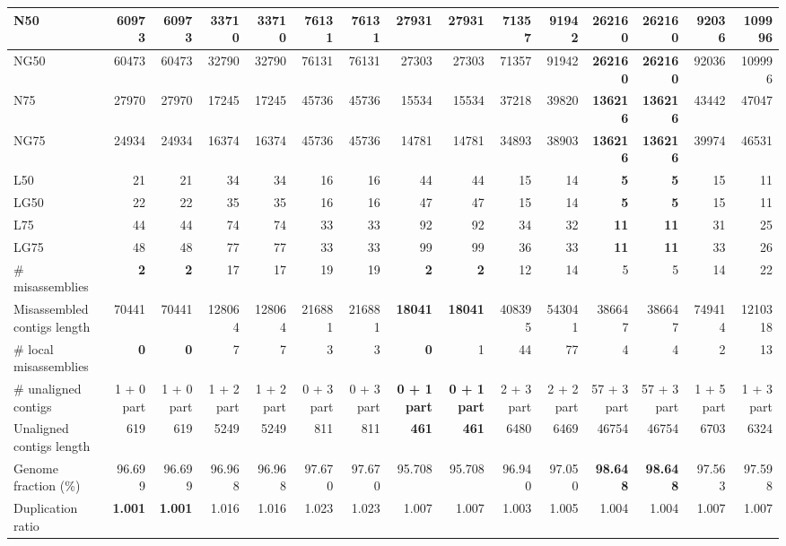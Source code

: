 \documentclass[12pt,a4paper]{article}
\begin{document}
\begin{table}[ht]
\begin{center}
\begin{tabular}{|l*{14}{|r}|}
N50 & 60973 & 60973 & 33710 & 33710 & 76131 & 76131 & 27931 & 27931 & 71357 & 91942 & {\bf 262160} & {\bf 262160} & 92036 & 109996 \\ \hline
NG50 & 60473 & 60473 & 32790 & 32790 & 76131 & 76131 & 27303 & 27303 & 71357 & 91942 & {\bf 262160} & {\bf 262160} & 92036 & 109996 \\ \hline
N75 & 27970 & 27970 & 17245 & 17245 & 45736 & 45736 & 15534 & 15534 & 37218 & 39820 & {\bf 136216} & {\bf 136216} & 43442 & 47047 \\ \hline
NG75 & 24934 & 24934 & 16374 & 16374 & 45736 & 45736 & 14781 & 14781 & 34893 & 38903 & {\bf 136216} & {\bf 136216} & 39974 & 46531 \\ \hline
L50 & 21 & 21 & 34 & 34 & 16 & 16 & 44 & 44 & 15 & 14 & {\bf 5} & {\bf 5} & 15 & 11 \\ \hline
LG50 & 22 & 22 & 35 & 35 & 16 & 16 & 47 & 47 & 15 & 14 & {\bf 5} & {\bf 5} & 15 & 11 \\ \hline
L75 & 44 & 44 & 74 & 74 & 33 & 33 & 92 & 92 & 34 & 32 & {\bf 11} & {\bf 11} & 31 & 25 \\ \hline
LG75 & 48 & 48 & 77 & 77 & 33 & 33 & 99 & 99 & 36 & 33 & {\bf 11} & {\bf 11} & 33 & 26 \\ \hline
\# misassemblies & {\bf 2} & {\bf 2} & 17 & 17 & 19 & 19 & {\bf 2} & {\bf 2} & 12 & 14 & 5 & 5 & 14 & 22 \\ \hline
Misassembled contigs length & 70441 & 70441 & 128064 & 128064 & 216881 & 216881 & {\bf 18041} & {\bf 18041} & 408395 & 543041 & 386647 & 386647 & 749414 & 1210318 \\ \hline
\# local misassemblies & {\bf 0} & {\bf 0} & 7 & 7 & 3 & 3 & {\bf 0} & 1 & 44 & 77 & 4 & 4 & 2 & 13 \\ \hline
\# unaligned contigs & 1 + 0 part & 1 + 0 part & 1 + 2 part & 1 + 2 part & 0 + 3 part & 0 + 3 part & {\bf 0 + 1 part} & {\bf 0 + 1 part} & 2 + 3 part & 2 + 2 part & 57 + 3 part & 57 + 3 part & 1 + 5 part & 1 + 3 part \\ \hline
Unaligned contigs length & 619 & 619 & 5249 & 5249 & 811 & 811 & {\bf 461} & {\bf 461} & 6480 & 6469 & 46754 & 46754 & 6703 & 6324 \\ \hline
Genome fraction (\%) & 96.699 & 96.699 & 96.968 & 96.968 & 97.670 & 97.670 & 95.708 & 95.708 & 96.940 & 97.050 & {\bf 98.648} & {\bf 98.648} & 97.563 & 97.598 \\ \hline
Duplication ratio & {\bf 1.001} & {\bf 1.001} & 1.016 & 1.016 & 1.023 & 1.023 & 1.007 & 1.007 & 1.003 & 1.005 & 1.004 & 1.004 & 1.007 & 1.007 \\ \hline

\end{tabular}
\end{center}
\end{table}
\end{document}

